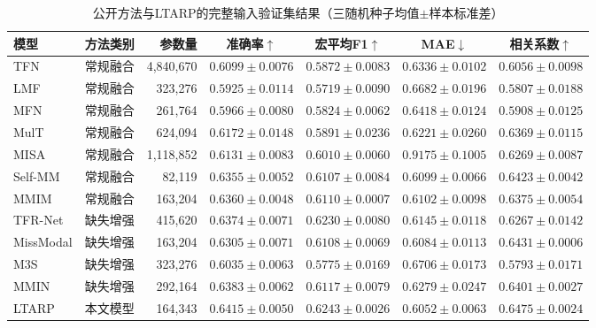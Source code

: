 \begin{table}[H]
\centering\scriptsize\setlength{\tabcolsep}{2.25pt}
\caption{公开方法与LTARP的完整输入验证集结果（三随机种子均值$\pm$样本标准差）}
\label{tab:q2_public_baselines}
\begin{tabular}{llrcccc}
\toprule
模型 & 方法类别 & 参数量 & 准确率$\uparrow$ & 宏平均F1$\uparrow$ & MAE$\downarrow$ & 相关系数$\uparrow$\\
\midrule
TFN & 常规融合 & 4,840,670 & $0.6099\pm0.0076$ & $0.5872\pm0.0083$ & $0.6336\pm0.0102$ & $0.6056\pm0.0098$\\
LMF & 常规融合 & 323,276 & $0.5925\pm0.0114$ & $0.5719\pm0.0090$ & $0.6682\pm0.0196$ & $0.5807\pm0.0188$\\
MFN & 常规融合 & 261,764 & $0.5966\pm0.0080$ & $0.5824\pm0.0062$ & $0.6418\pm0.0124$ & $0.5908\pm0.0125$\\
MulT & 常规融合 & 624,094 & $0.6172\pm0.0148$ & $0.5891\pm0.0236$ & $0.6221\pm0.0260$ & $0.6369\pm0.0115$\\
MISA & 常规融合 & 1,118,852 & $0.6131\pm0.0083$ & $0.6010\pm0.0060$ & $0.9175\pm0.1005$ & $0.6269\pm0.0087$\\
Self-MM & 常规融合 & 82,119 & $0.6355\pm0.0052$ & $0.6107\pm0.0084$ & $0.6099\pm0.0066$ & $0.6423\pm0.0042$\\
MMIM & 常规融合 & 163,204 & $0.6360\pm0.0048$ & $0.6110\pm0.0007$ & $0.6102\pm0.0098$ & $0.6375\pm0.0054$\\
\addlinespace\midrule
TFR-Net & 缺失增强 & 415,620 & $0.6374\pm0.0071$ & $0.6230\pm0.0080$ & $0.6145\pm0.0118$ & $0.6267\pm0.0142$\\
MissModal & 缺失增强 & 163,204 & $0.6305\pm0.0071$ & $0.6108\pm0.0069$ & $0.6084\pm0.0113$ & $0.6431\pm0.0006$\\
M3S & 缺失增强 & 323,276 & $0.6035\pm0.0063$ & $0.5775\pm0.0169$ & $0.6706\pm0.0173$ & $0.5793\pm0.0171$\\
MMIN & 缺失增强 & 292,164 & $0.6383\pm0.0062$ & $0.6117\pm0.0079$ & $0.6279\pm0.0247$ & $0.6401\pm0.0027$\\
\addlinespace\midrule
LTARP & 本文模型 & 164,343 & $0.6415\pm0.0050$ & $0.6243\pm0.0026$ & $0.6052\pm0.0063$ & $0.6475\pm0.0024$\\
\bottomrule
\end{tabular}
\end{table}